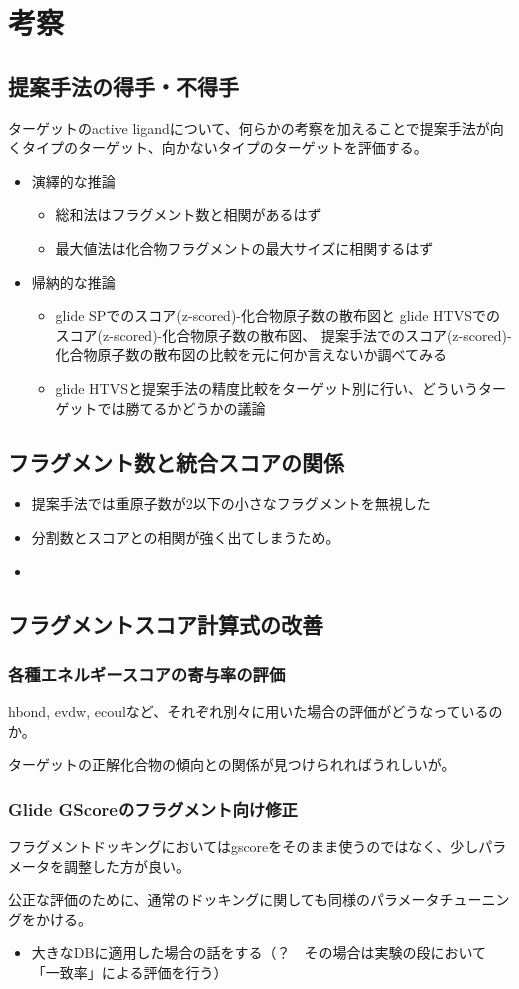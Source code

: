 \chapter{考察}

\section{提案手法の得手・不得手}
ターゲットのactive ligandについて、何らかの考察を加えることで提案手法が向くタイプのターゲット、向かないタイプのターゲットを評価する。
\begin{itemize}
\item 演繹的な推論
	\begin{itemize}
	\item 総和法はフラグメント数と相関があるはず
	\item 最大値法は化合物フラグメントの最大サイズに相関するはず
	\end{itemize}
\item 帰納的な推論
	\begin{itemize}
	\item glide SPでのスコア(z-scored)-化合物原子数の散布図と
		glide HTVSでのスコア(z-scored)-化合物原子数の散布図、
		提案手法でのスコア(z-scored)-化合物原子数の散布図の比較を元に何か言えないか調べてみる
	\item glide HTVSと提案手法の精度比較をターゲット別に行い、どういうターゲットでは勝てるかどうかの議論
	\end{itemize}
\end{itemize}

\section{フラグメント数と統合スコアの関係}
\begin{itemize} 
\item 提案手法では重原子数が2以下の小さなフラグメントを無視した
\item 分割数とスコアとの相関が強く出てしまうため。
\item 
\end{itemize}


\section{フラグメントスコア計算式の改善}
\subsection{各種エネルギースコアの寄与率の評価}
hbond, evdw, ecoulなど、それぞれ別々に用いた場合の評価がどうなっているのか。

ターゲットの正解化合物の傾向との関係が見つけられればうれしいが。
\subsection{Glide GScoreのフラグメント向け修正}
フラグメントドッキングにおいてはgscoreをそのまま使うのではなく、少しパラメータを調整した方が良い。

公正な評価のために、通常のドッキングに関しても同様のパラメータチューニングをかける。

\begin{itemize}
\item 大きなDBに適用した場合の話をする（？　その場合は実験の段において「一致率」による評価を行う）
\end{itemize}
